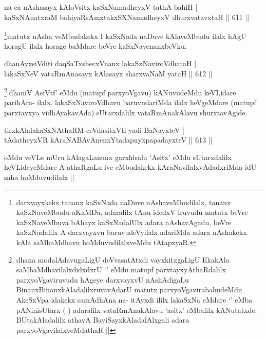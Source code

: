 \begin{shl}
na ca nAshasayx kAloV\s sitx kaSxNamadheyxV tathA bahiH | \\
kaSxNAnatxraM bahiyaRsAmxtakxSXNamadheyxV dhurxvatavxtaH \hfill||  611 ||  
\end{shl}

\begin{artha}
\footnote{darxvayxkekx tananx kaSxNada naDuve nAshaveMbudilalx, tananx kaSxNaveMbudu aKaMDa, adaralilx tAnu idedxV iruvudu matutx beVre kaSxNaveMbuva bAhayx kaSxNadalUlx adara nAshavAgadu, beVre kaSxNadalilx A darxvayxvu baruvudeVyilalx adariMda adara nAshakekx kAla saMbaMdhavu hoMduvudilalxveMdu tAtapxyaR.}matutx nAsha veMbudakekx I kaSxNada naDuve kAlaveMbudu ilalx hAgU horagU ilalx horage baMdare beVre kaSxNavenanxbeVku.
\end{artha}


\begin{shl}
dhanAyxsiVditi daqSaTxshecxVnanx lakaSxNaviroVdhataH | \\
lakaSxNeV vataRmAnasayx kAlasayx sharxvaNaM yataH \hfill||  612 ||  
\end{shl}

\begin{artha}
\footnote{dhana modalAdavugaLigU deVvasatAtxdi vayxkitxgaLigU EkakAla saMbaMdhavilalxdidxdxrU `\stext' eMdu matupf parxtayxyAthaRdalilx parxyoVgaviruvudu hAgeye darxvayxvU nAshAdigaLu BinanxBinanxkAladalilxruvavAdarU matutx parxyoVgavirabahudeMdu AkeSxVpa idakekx samAdhAna na- itAyxdi ililx lakaSxNa eMdare `\stext' eMba pANinisUtarx (  ) adaralilx vataRmAnakAlavu `asitx' eMbalilx kANutatxde. BUtakAladalilx athavA BaviSayxkAladalAlxgali adara parxyoVgavilalxveMdathaR ||}`dhaniV AsiVtf' eMdu (matupf parxyoVgavu) kANuvudeMdu keVLidare  parihAra- ilalx. lakaSxNaviroVdhavu baruvudariMda ilalx heVgeMdare (matupf parxtayxya vidhAyakavAda) sUtarxdalilx vataRmAnakAlavu shurxtavAgide.
\end{artha}

\begin{shl}
tirxkAlalakaSxNAthaRM ceVdasitxVti yadi BaNayxteV | \\
tAdatheyxVR kAraNABAvAnenxYtadapuyxpapadayxteV \hfill||  613 ||  
\end{shl}

\begin{artha}
oMdu veVLe mUru kAlagaLanunx garxhisalu `Asitx' eMdu sUtarxdalilx heVLideyeMdare A athaRgaLu ive eMbudakekx kAraNavilalxvAdadxriMda idU saha hoMduvudilalx ||
\end{artha}

